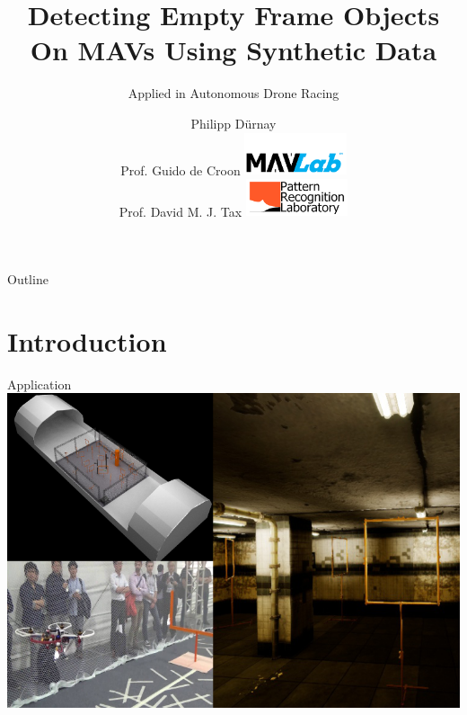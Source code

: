 \documentclass{beamer}
\title{Detecting Empty Frame Objects On MAVs Using Synthetic Data} %
\subtitle{Applied in Autonomous Drone Racing} %
\author{Philipp Dürnay\\ \bigskip \bigskip Prof. Guido de Croon \hfill	\includegraphics[width=3cm]{fig/mavlab}\\
	 Prof. David M. J. Tax  \hfill \includegraphics[width=3cm]{fig/prgroup}%
}
\begin{document}
  \frame{\maketitle}


  \begin{darkframes}
  	\begin{frame}{Outline}
  		\tableofcontents
  	\end{frame}
	\section{Introduction}
    \begin{frame}{Application}
    	\includegraphics[width=\textwidth]{fig/application}
    \end{frame}


\end{darkframes}
\end{document}
